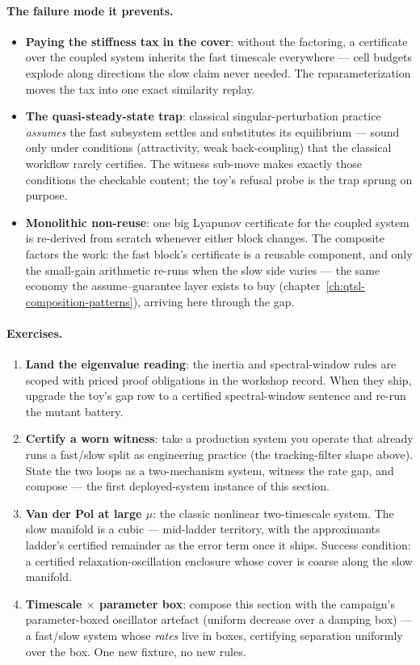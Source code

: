 \paragraph{The failure mode it prevents.}
\begin{itemize}
\item \textbf{Paying the stiffness tax in the cover}: without the
  factoring, a certificate over the coupled system inherits the fast
  timescale everywhere --- cell budgets explode along directions the
  slow claim never needed. The reparameterization moves the tax into
  one exact similarity replay.
\item \textbf{The quasi-steady-state trap}: classical
  singular-perturbation practice \emph{assumes} the fast subsystem
  settles and substitutes its equilibrium --- sound only under
  conditions (attractivity, weak back-coupling) that the classical
  workflow rarely certifies. The witness sub-move makes exactly those
  conditions the checkable content; the toy's refusal probe is the
  trap sprung on purpose.
\item \textbf{Monolithic non-reuse}: one big Lyapunov certificate for
  the coupled system is re-derived from scratch whenever either block
  changes. The composite factors the work: the fast block's
  certificate is a reusable component, and only the small-gain
  arithmetic re-runs when the slow side varies --- the same economy
  the assume--guarantee layer exists to buy
  (chapter~\ref{ch:qtsl-composition-patterns}), arriving here through
  the gap.
\end{itemize}

\paragraph{Exercises.}
\begin{enumerate}
\item \textbf{Land the eigenvalue reading}: the inertia and
  spectral-window rules are scoped with priced proof obligations in
  the workshop record. When they ship, upgrade the toy's gap row to a
  certified spectral-window sentence and re-run the mutant battery.
\item \textbf{Certify a worn witness}: take a production system you
  operate that already runs a fast/slow split as engineering practice
  (the tracking-filter shape above). State the two loops as a
  two-mechanism system, witness the rate gap, and compose --- the
  first deployed-system instance of this section.
\item \textbf{Van der Pol at large $\mu$}: the classic nonlinear
  two-timescale system. The slow manifold is a cubic --- mid-ladder
  territory, with the approximants ladder's certified remainder as the
  error term once it ships. Success condition: a certified
  relaxation-oscillation enclosure whose cover is coarse along the
  slow manifold.
\item \textbf{Timescale $\times$ parameter box}: compose this section
  with the campaign's parameter-boxed oscillator artefact (uniform
  decrease over a damping box) --- a fast/slow system whose
  \emph{rates} live in boxes, certifying separation uniformly over the
  box. One new fixture, no new rules.
\end{enumerate}

